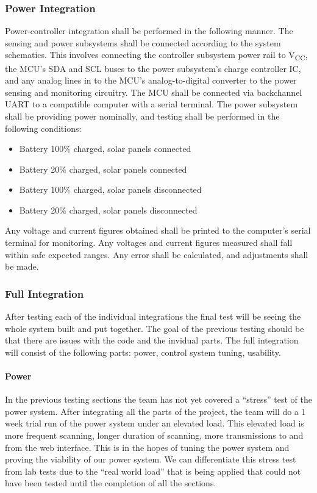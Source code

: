\subsubsection{Power Integration}
Power-controller integration shall be performed in the following manner. The sensing and power subsystems shall be connected according to the system schematics. This involves connecting the controller subsystem power rail to V\textsubscript{CC}, the MCU's SDA and SCL buses to the power subsystem's charge controller IC, and any analog lines in to the MCU's analog-to-digital converter to the power sensing and monitoring circuitry. The MCU shall be connected via backchannel UART to a compatible computer with a serial terminal. The power subsystem shall be providing power nominally, and testing shall be performed in the following conditions:
\begin{itemize}
    \item Battery 100\% charged, solar panels connected
    \item Battery 20\% charged, solar panels connected
    \item Battery 100\% charged, solar panels disconnected
    \item Battery 20\% charged, solar panels disconnected
\end{itemize}
Any voltage and current figures obtained shall be printed to the computer's serial terminal for monitoring. Any voltages and current figures measured shall fall within safe expected ranges. Any error shall be calculated, and adjustments shall be made.

\subsubsection{Full Integration}
After testing each of the individual integrations the final test will be seeing the whole system built and put together. The goal of the previous testing should be that there are issues with the code and the invidual parts. The full integration will consist of the following parts: power, control system tuning, usability.

\paragraph{Power}
In the previous testing sections the team has not yet covered a ``stress'' test of the power system. After integrating all the parts of the project, the team will do a 1 week trial run of the power system under an elevated load. This elevated load is more frequent scanning, longer duration of scanning, more transmissions to and from the web interface. This is in the hopes of tuning the power system and proving the viability of our power system. We can differentiate this stress test from lab tests due to the ``real world load'' that is being applied that could not have been tested until the completion of all the sections.

